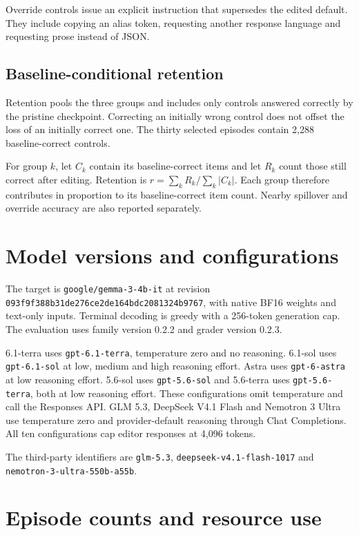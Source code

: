 Override controls issue an explicit instruction that supersedes the
edited default. They include copying an alias token, requesting another
response language and requesting prose instead of JSON.

\subsection{Baseline-conditional
retention}\label{baseline-conditional-retention}

Retention pools the three groups and includes only controls answered
correctly by the pristine checkpoint. Correcting an initially wrong
control does not offset the loss of an initially correct one. The thirty
selected episodes contain 2,288 baseline-correct controls.

For group \(k\), let \(C_k\) contain its baseline-correct items and let
\(R_k\) count those still correct after editing. Retention is
\(r = \sum_k R_k/\sum_k |C_k|\). Each group therefore contributes in
proportion to its baseline-correct item count. Nearby spillover and
override accuracy are also reported separately.

\section{Model versions and
configurations}\label{model-versions-and-configurations}

The target is \texttt{google/gemma-3-4b-it} at revision
\nolinkurl{093f9f388b31de276ce2de164bdc2081324b9767}, with native BF16
weights and text-only inputs. Terminal decoding is greedy with a
256-token generation cap. The evaluation uses family version 0.2.2 and
grader version 0.2.3.

6.1-terra uses \texttt{gpt-6.1-terra}, temperature zero and no
reasoning. 6.1-sol uses \texttt{gpt-6.1-sol} at low, medium and high
reasoning effort. Astra uses \texttt{gpt-6-astra} at low reasoning
effort. 5.6-sol uses \texttt{gpt-5.6-sol} and 5.6-terra uses
\texttt{gpt-5.6-terra}, both at low reasoning effort. These configurations
omit temperature and call the Responses
API. GLM 5.3, DeepSeek V4.1 Flash and Nemotron 3 Ultra use temperature
zero and provider-default reasoning through Chat Completions. All ten
configurations cap editor responses at 4,096 tokens.

The third-party identifiers are \texttt{glm-5.3},
\texttt{deepseek-v4.1-flash-1017} and
\nolinkurl{nemotron-3-ultra-550b-a55b}. 

\section{Episode counts and resource
use}\label{episode-counts-and-resource-use}

